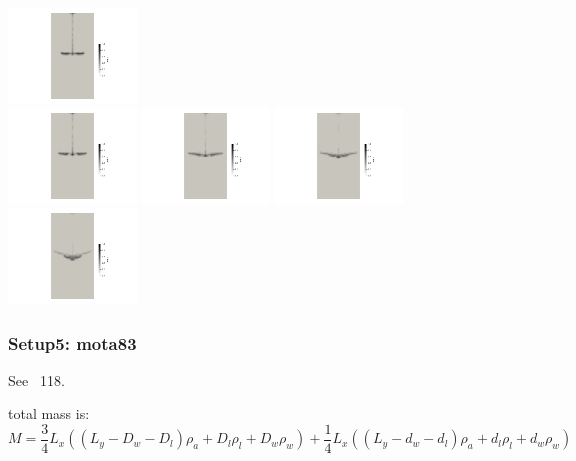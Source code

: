 \begin{center}
\includegraphics[width=3.4cm]{python_codes/fieldstone_67/dripping/converted_0019.jpg}\\
\includegraphics[width=3.4cm]{python_codes/fieldstone_67/dripping/converted_0020.jpg}
\includegraphics[width=3.4cm]{python_codes/fieldstone_67/dripping/converted_0021.jpg}
\includegraphics[width=3.4cm]{python_codes/fieldstone_67/dripping/converted_0022.jpg}
\includegraphics[width=3.4cm]{python_codes/fieldstone_67/dripping/converted_0023.jpg}
\end{center}



\newpage
\subsubsection*{Setup5: mota83}

See \stone~118. 

total mass is:
\[
M=\frac34 L_x \left( (L_y-D_w-D_l) \rho_a + D_l \rho_l + D_w \rho_w \right)
+ \frac14 L_x \left( (L_y-d_w-d_l) \rho_a + d_l \rho_l + d_w \rho_w \right)
\]







